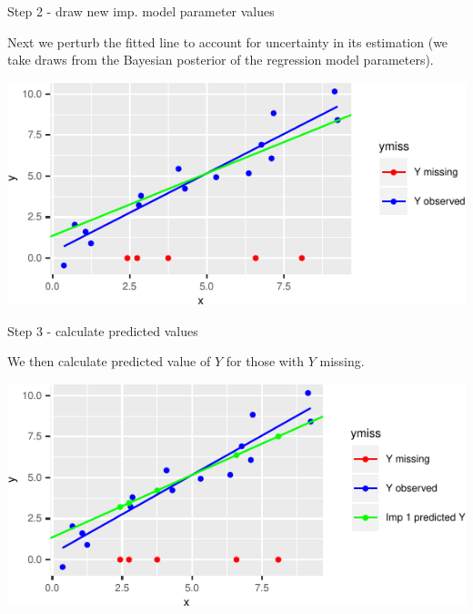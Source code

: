 \documentclass[ignorenonframetext,]{beamer}
\begin{document}
\begin{frame}{Step 2 - draw new imp. model parameter values}
\protect\hypertarget{step-2---draw-new-imp.-model-parameter-values}{}

Next we perturb the fitted line to account for uncertainty in its
estimation (we take draws from the Bayesian posterior of the regression
model parameters).

\begin{center}\includegraphics{Lecture2_files/figure-beamer/unnamed-chunk-17-1} \end{center}

\end{frame}

\begin{frame}{Step 3 - calculate predicted values}
\protect\hypertarget{step-3---calculate-predicted-values}{}

We then calculate predicted value of \(Y\) for those with \(Y\) missing.

\begin{center}\includegraphics{Lecture2_files/figure-beamer/unnamed-chunk-19-1} \end{center}

\end{frame}
\end{document}

